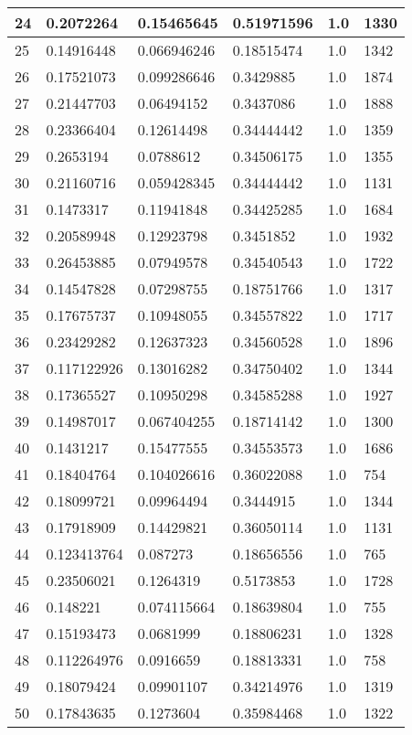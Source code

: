 \begin{longtable}{|l|l|l|l|l|l|}
24 & 0.2072264 & 0.15465645 & 0.51971596 & 1.0 & 1330 \\ \hline 
25 & 0.14916448 & 0.066946246 & 0.18515474 & 1.0 & 1342 \\ \hline 
26 & 0.17521073 & 0.099286646 & 0.3429885 & 1.0 & 1874 \\ \hline 
27 & 0.21447703 & 0.06494152 & 0.3437086 & 1.0 & 1888 \\ \hline 
28 & 0.23366404 & 0.12614498 & 0.34444442 & 1.0 & 1359 \\ \hline 
29 & 0.2653194 & 0.0788612 & 0.34506175 & 1.0 & 1355 \\ \hline 
30 & 0.21160716 & 0.059428345 & 0.34444442 & 1.0 & 1131 \\ \hline 
31 & 0.1473317 & 0.11941848 & 0.34425285 & 1.0 & 1684 \\ \hline 
32 & 0.20589948 & 0.12923798 & 0.3451852 & 1.0 & 1932 \\ \hline 
33 & 0.26453885 & 0.07949578 & 0.34540543 & 1.0 & 1722 \\ \hline 
34 & 0.14547828 & 0.07298755 & 0.18751766 & 1.0 & 1317 \\ \hline 
35 & 0.17675737 & 0.10948055 & 0.34557822 & 1.0 & 1717 \\ \hline 
36 & 0.23429282 & 0.12637323 & 0.34560528 & 1.0 & 1896 \\ \hline 
37 & 0.117122926 & 0.13016282 & 0.34750402 & 1.0 & 1344 \\ \hline 
38 & 0.17365527 & 0.10950298 & 0.34585288 & 1.0 & 1927 \\ \hline 
39 & 0.14987017 & 0.067404255 & 0.18714142 & 1.0 & 1300 \\ \hline 
40 & 0.1431217 & 0.15477555 & 0.34553573 & 1.0 & 1686 \\ \hline 
41 & 0.18404764 & 0.104026616 & 0.36022088 & 1.0 & 754 \\ \hline 
42 & 0.18099721 & 0.09964494 & 0.3444915 & 1.0 & 1344 \\ \hline 
43 & 0.17918909 & 0.14429821 & 0.36050114 & 1.0 & 1131 \\ \hline 
44 & 0.123413764 & 0.087273 & 0.18656556 & 1.0 & 765 \\ \hline 
45 & 0.23506021 & 0.1264319 & 0.5173853 & 1.0 & 1728 \\ \hline 
46 & 0.148221 & 0.074115664 & 0.18639804 & 1.0 & 755 \\ \hline 
47 & 0.15193473 & 0.0681999 & 0.18806231 & 1.0 & 1328 \\ \hline 
48 & 0.112264976 & 0.0916659 & 0.18813331 & 1.0 & 758 \\ \hline 
49 & 0.18079424 & 0.09901107 & 0.34214976 & 1.0 & 1319 \\ \hline 
50 & 0.17843635 & 0.1273604 & 0.35984468 & 1.0 & 1322 \\ \hline 
\end{longtable}